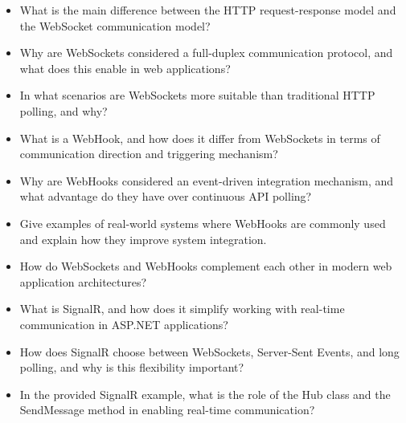 \begin{itemize}
    \item What is the main difference between the HTTP request-response model and the WebSocket communication model?

    \item Why are WebSockets considered a full-duplex communication protocol, and what does this enable in web applications?

    \item In what scenarios are WebSockets more suitable than traditional HTTP polling, and why?

    \item What is a WebHook, and how does it differ from WebSockets in terms of communication direction and triggering mechanism?

    \item Why are WebHooks considered an event-driven integration mechanism, and what advantage do they have over continuous API polling?

    \item Give examples of real-world systems where WebHooks are commonly used and explain how they improve system integration.

    \item How do WebSockets and WebHooks complement each other in modern web application architectures?

    \item What is SignalR, and how does it simplify working with real-time communication in ASP.NET applications?

    \item How does SignalR choose between WebSockets, Server-Sent Events, and long polling, and why is this flexibility important?

    \item In the provided SignalR example, what is the role of the Hub class and the SendMessage method in enabling real-time communication?
\end{itemize}

